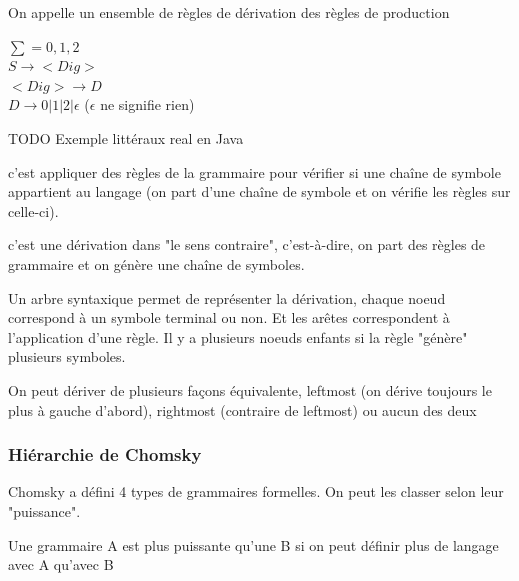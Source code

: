 \begin{mydef}
	On appelle un ensemble de règles de dérivation des règles de production
\end{mydef}

\begin{myexem}
	$\sum ={0,1,2}$ \\
	$S \rightarrow <Dig>$ \\
	$<Dig> \rightarrow D$ \\
	$D \rightarrow 0 | 1 |2 | \epsilon $ ($\epsilon$ ne signifie rien)
\end{myexem}
TODO Exemple littéraux real en Java

\begin{mydef}[Dériver] c'est appliquer des règles de la grammaire pour vérifier 
	si une chaîne de symbole appartient au langage (on part d'une chaîne de symbole 
	et on vérifie les règles sur celle-ci).
\end{mydef}

\begin{mydef}[Inférer] c'est une dérivation dans "le sens contraire", 
	c'est-à-dire, on part des règles de grammaire et on génère une chaîne 
	de symboles.
\end{mydef}

\begin{mydef}
	Un arbre syntaxique permet de représenter la dérivation, chaque noeud 
	correspond à un symbole terminal ou non. Et les arêtes correspondent à 
	l'application d'une règle. Il y a plusieurs noeuds enfants si la règle 
	"génère" plusieurs symboles.
\end{mydef}

\begin{myprop}
	On peut dériver de plusieurs façons équivalente, leftmost (on dérive 
	toujours le plus à gauche d'abord), rightmost (contraire de leftmost) 
	ou  aucun des deux
\end{myprop}

\subsubsection{Hiérarchie de Chomsky}
\label{ssub:hi_rarchie_de_chomsky}

Chomsky a défini 4 types de grammaires formelles. On peut les classer selon 
leur "puissance".

\begin{mydef}
	Une grammaire A est plus puissante qu'une B si on peut définir plus 
	de langage avec A qu'avec B
\end{mydef}

